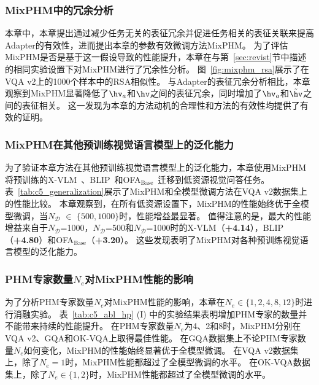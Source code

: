 \subsubsection{MixPHM中的冗余分析}
本章中，本章提出通过减少任务无关的表征冗余并促进任务相关的表征关联来提高Adapter的有效性，进而提出本章的参数有效微调方法MixPHM。
为了评估MixPHM是否是基于这一假设导致的性能提升，本章在与第~\ref{sec:revist}节中描述的相同实验设置下对MixPHM进行了冗余性分析。
图~\ref{fig:mixphm_rsa}展示了在VQA v2上的1000个样本中的RSA相似性。
与Adapter的表征冗余分析相比，本章观察到MixPHM显著降低了$\hv_a$和$\hv$之间的表征冗余，同时增加了$\hv_a$和$\tilde{\hv}$之间的表征相关。
这一发现为本章的方法动机的合理性和方法的有效性均提供了有效的证明。




\subsubsection{MixPHM在其他预训练视觉语言模型上的泛化能力}
为了验证本章方法在其他预训练视觉语言模型上的泛化能力，本章使用MixPHM将预训练的X-VLM~\cite{zeng2022multi}、BLIP~\cite{li2022blip}和OFA$_{\text{Base}}$~\cite{wang2022ofa}迁移到低资源视觉问答任务。
表~\ref{tab:c5_generalization}展示了MixPHM和全模型微调方法在VQA v2数据集上的性能比较。
本章观察到，在所有低资源设置下，MixPHM的性能始终优于全模型微调，当$N_{\mathcal{D}}$ $\in$ $\{500,1000\}$时，性能增益最显著。
值得注意的是，最大的性能增益来自于$N_{\mathcal{D}}$=1000，$N_{\mathcal{D}}$=500和$N_{\mathcal{D}}$=1000时的X-VLM（\textbf{+4.14}），BLIP（\textbf{+4.80}）和OFA$_{\text{Base}}$（\textbf{+3.20}）。
这些发现表明了MixPHM对各种预训练视觉语言模型的泛化能力。







\subsubsection{PHM专家数量$N_e$对MixPHM性能的影响}
为了分析PHM专家数量$N_e$对MixPHM性能的影响，本章在$N_e \in \{1, 2, 4, 8, 12\}$时进行消融实验。
表~\ref{tab:c5_abl_hp} (I) 中的实验结果表明增加PHM专家的数量并不能带来持续的性能提升。
在PHM专家数量$N_e$为4、2和8时，MixPHM分别在VQA v2、GQA和OK-VQA上取得最佳性能。
在GQA数据集上不论PHM专家数量$N_e$如何变化，MixPHM的性能始终显著优于全模型微调。
在VQA v2数据集上，除了$N_e=1$时，MixPHM性能都超过了全模型微调的水平。
在OK-VQA数据集上，除了$N_e\in \{1, 2\}$时，MixPHM性能都超过了全模型微调的水平。


